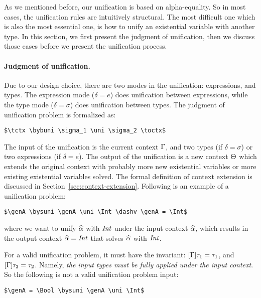 As we mentioned before, our unification is based on alpha-equality. So in most
cases, the unification rules are intuitively structural. The most difficult one
which is also the most essential one, is how to unify an existential variable
with another type. In this section, we first present the judgment of
unification, then we discuss those cases before we present the unification
process.

\paragraph{Judgment of unification.}

Due to our design choice, there are two modes in the
unification: expressions, and types. The expression mode ($\delta = e$) does
unification between expressions, while the type mode ($\delta = \sigma$) does
unification between types.
The judgment of unification problem is formalized as:

\begin{lstlisting}
$\tctx \bybuni \sigma_1 \uni \sigma_2 \toctx$
\end{lstlisting}

The input of the unification is the current context $\Gamma$, and two types
(if $\delta = \sigma$) or two expressions (if $\delta = e$).
The output of the unification
is a new context $\Theta$ which extends the original context with probably more
new existential variables or more existing
existential variables solved.
The formal definition of context extension is discussed in
Section~\ref{sec:context-extension}.
Following is an example of a unification problem:

\begin{lstlisting}
$\genA \bysuni \genA \uni \Int \dashv \genA = \Int$
\end{lstlisting}

\noindent where we want to unify $\widehat{\alpha}$ with $\mathit{Int}$ under the input context
$\widehat{\alpha}$, which results in the output context $\widehat{\alpha} = \mathit{Int}$ that solves $\widehat{\alpha}$
with $\mathit{Int}$.

For a valid unification problem, it must have the invariant: $[\Gamma] \tau_1 =
\tau_1$, and $[\Gamma] \tau_2 = \tau_2$. Namely,
\textit{the input types must be
fully applied under the input context}.
 So the following is not a valid
unification problem input:

\begin{lstlisting}
$\genA = \Bool \bysuni \genA \uni \Int$
\end{lstlisting}

